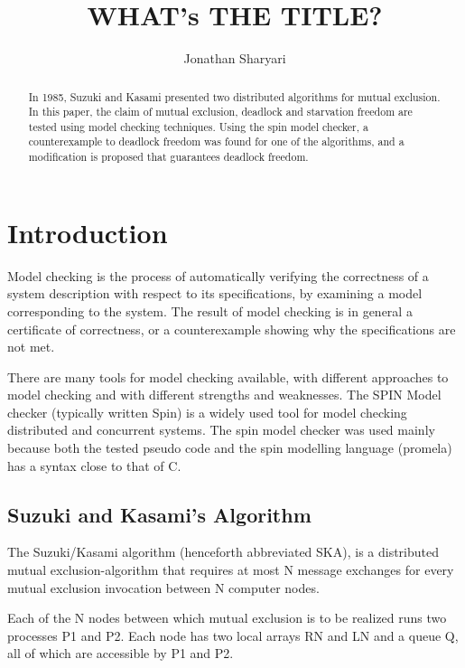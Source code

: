 \documentclass[a4paper,12pt]{llncs}
\title{\textbf{WHAT's THE TITLE?}}
\author{Jonathan Sharyari}
\institute{Freie Universit{\"a}t Berlin, Computer Science Department\\
Takustra{\ss}e 9. 14195 Berlin, Germany\\
\mailsa
}
\begin{document}
\maketitle

\begin{abstract}
In 1985, Suzuki and Kasami presented two distributed algorithms for mutual exclusion. In this paper, the claim of mutual exclusion, deadlock and starvation freedom are tested using model checking techniques. Using the spin model checker, a counterexample to deadlock freedom was found for one of the algorithms, and a modification is proposed that guarantees deadlock freedom.
\end{abstract}
\newpage

\section{Introduction}
Model checking is the process of automatically verifying the correctness of a system description with respect to its specifications, by examining a model corresponding to the system. The result of model checking is in general a certificate of correctness, or a counterexample showing why the specifications are not met.

There are many tools for model checking available, with different approaches to model checking and with different strengths and weaknesses. The SPIN Model checker (typically written Spin) is a widely used tool for model checking distributed and concurrent systems. The spin model checker was used mainly because both the tested pseudo code and the spin modelling language (promela) has a syntax close to that of C.


\subsection{Suzuki and Kasami's Algorithm}

The Suzuki/Kasami algorithm (henceforth abbreviated SKA), is a distributed mutual exclusion-algorithm that requires at most N message exchanges for every mutual exclusion invocation between N computer nodes.

Each of the N nodes between which mutual exclusion is to be realized runs two processes P1 and P2. Each node has two local arrays RN and LN and a queue Q, all of which are accessible by P1 and P2.
\end{document}
